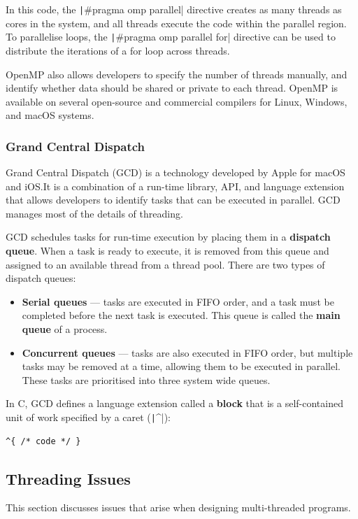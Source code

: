 \documentclass{article}
\begin{document}
\inputminted{c}{code/openmp.c}

In this code, the \texttt|#pragma omp parallel| directive
creates as many threads as cores in the system, and all threads execute
the code within the parallel region. To parallelise loops, the
\texttt|#pragma omp parallel for| directive can be used to
distribute the iterations of a for loop across threads.

OpenMP also allows developers to specify the number of threads
manually, and identify whether data should be shared or private to each
thread. OpenMP is available on several open-source and commercial
compilers for Linux, Windows, and macOS systems.
\subsubsection{Grand Central Dispatch}
Grand Central Dispatch (GCD) is a technology developed by Apple for
macOS and iOS.\@ It is a combination of a run-time library, API, and
language extension that allows developers to identify tasks that can be
executed in parallel. GCD manages most of the details of threading.

GCD schedules tasks for run-time execution by placing them in a
\textbf{dispatch queue}. When a task is ready to execute, it is removed
from this queue and assigned to an available thread from a thread pool.
There are two types of dispatch queues:
\begin{itemize}
    \item \textbf{Serial queues} --- tasks are executed in FIFO order,
          and a task must be completed before the next task is executed.
          This queue is called the \textbf{main queue} of a process.
    \item \textbf{Concurrent queues} --- tasks are also executed in
          FIFO order, but multiple tasks may be removed at a time,
          allowing them to be executed in parallel.
          These tasks are prioritised into three system wide queues.
\end{itemize}
In C, GCD defines a language extension called a \textbf{block} that is a
self-contained unit of work specified by a caret (\texttt|^|):
\begin{verbatim}
^{ /* code */ }
\end{verbatim}
\subsection{Threading Issues}
This section discusses issues that arise when designing multi-threaded
programs.
\end{document}
